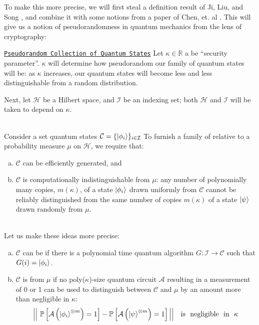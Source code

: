 To make this more precise, we will first steal a definition result of Ji, Liu, and Song \cite{Zhengfeng:2020}, and combine it with some notions from a paper of Chen, et. al \cite{chen2017computational}.
%
This will give us a notion of pseudorandomness in quantum mechanics from the lens of cryptography:
\begin{definition}{
\href{https://arxiv.org/pdf/1711.00385.pdf\#page=7\&zoom=175,0,550}
{\texttt{Pseudorandom Collection of Quantum States}}
}{}
Let \(\kappa\in\mathbb{R}\) a be ``security parameter''.
%
\(\kappa\) will determine how pseudorandom our family of quantum states will be:
%
as \(\kappa\) increases, our quantum states will become less and less distinguishable from a random distribution.

%
Next, let \(\mathcal{H}\) be a Hilbert space, and \(\mathcal{I}\) be an indexing set;
%
both \(\mathcal{H}\) and \(\mathcal{I}\) will be taken to depend on \(\kappa\).

~\\
Consider a set quantum states \(\mathcal{C} = \{\ket{\phi_i}\}_{i\in\mathcal{I}}\)
%
To furnish a family of  relative to a probability measure \(\mu\) on \(\mathcal{H}\), we require that:
\begin{enumerate}[(a)]
	\item
	\(\mathcal{C}\) can be efficiently generated, and
	
	\item
	\(\mathcal{C}\) is computationally indistinguishable from \(\mu\): any number of polynomially many copies, \(m(\kappa)\), of a state \(\ket{\phi_i}\) drawn uniformly from \(\mathcal{C}\) cannot be reliably distinguished from the same number of copies \(m(\kappa)\) of a state \(\ket{\psi}\) drawn randomly from \(\mu\).
\end{enumerate}

~\\
Let us make these ideas more precise:
\begin{enumerate}[(a)]
	\item
	\(\mathcal{C}\) can be  if there is a polynomial time quantum algorithm \(G:\mathcal{I}\to\mathcal{C}\) such that \(G(i) = \ket{\phi_i}\).
	
	\item
	\(\mathcal{C}\) is  from \(\mu\) if no poly(\(\kappa\))-size quantum circuit \(\mathcal{A}\) resulting in a measurement of 0 or 1 can be used to distinguish between \(\mathcal{C}\) and \(\mu\) by an amount more than negligible in \(\kappa\):
	\begin{equation}
	        \label{eqn:jls_pseudorand}
		\Big|\Big|~
			\mathbb{P}\left[\mathcal{A}\left(\ket{\phi_i}^{\otimes m}\right) = 1\right]
			-
			\mathbb{P}\left[\mathcal{A}\left(\ket{\psi}^{\otimes m}\right) = 1\right]
		\Big|\Big|
		~~~\textrm{is~ negligible~ in~~}\kappa
	\end{equation}

\end{enumerate}
\end{definition}

